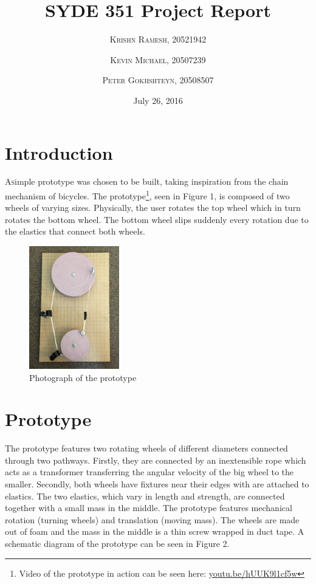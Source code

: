 \documentclass[twoside,twocolumn]{article}
\title{SYDE 351 Project Report} %
\author{%
\textsc{Krishn Ramesh, 20521942} \\[1ex]
\and
\textsc{Kevin Michael, 20507239} \\[1ex]
\and
\textsc{Peter Gokhshteyn, 20508507} \\[1ex]
}
\date{July 26, 2016} %
\begin{document}
\maketitle


\section{Introduction}

\lettrine[nindent=0em,lines=3]{A} simple prototype was chosen to be built, taking inspiration from the chain mechanism of bicycles. The prototype\footnote{Video of the prototype in action can be seen here: \href{url}{youtu.be/hUUK9l1cf5w}}, seen in Figure 1, is composed of two wheels of varying sizes. Physically, the user rotates the top wheel which in turn rotates the bottom wheel. The bottom wheel slips suddenly every rotation due to the elastics that connect both wheels.

\begin{figure}[!ht]
    \caption{Photograph of the prototype}
    \centering
        \includegraphics[width=0.35\textwidth]{prototype.jpg}
\end{figure}


\section{Prototype}

The prototype features two rotating wheels of different diameters connected through two pathways. Firstly, they are connected by an inextensible rope which acts as a transformer transferring the angular velocity of the big wheel to the smaller. Secondly, both wheels have fixtures near their edges with are attached to elastics. The two elastics, which vary in length and strength, are connected together with a small mass in the middle. The prototype features mechanical rotation (turning wheels) and translation (moving mass). The wheels are made out of foam and the mass in the middle is a thin screw wrapped in duct tape. A schematic diagram of the prototype can be seen in Figure 2.
\end{document}
